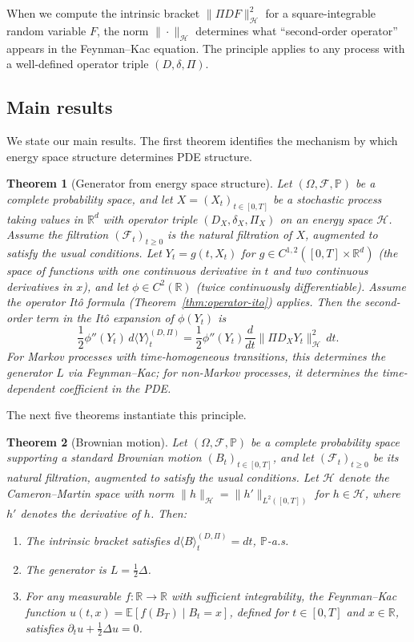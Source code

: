\documentclass[12pt]{article}
\theoremstyle{plain}
\newtheorem{theorem}{Theorem}[section]
\theoremstyle{definition}
\theoremstyle{remark}
\newcommand{\E}{\mathbb{E}}
\newcommand{\R}{\mathbb{R}}
\newcommand{\F}{\mathcal{F}}
\newcommand{\PP}{\mathbb{P}}
\newcommand{\HH}{\mathcal{H}}
\begin{document}
When we compute the intrinsic bracket $\|\Pi DF\|_{\HH}^2$ for a square-integrable random variable $F$, the norm $\|\cdot\|_{\HH}$ determines what ``second-order operator'' appears in the Feynman--Kac equation. The principle applies to any process with a well-defined operator triple $(D, \delta, \Pi)$.

\subsection{Main results}

We state our main results. The first theorem identifies the mechanism by which energy space structure determines PDE structure.

\begin{theorem}[Generator from energy space structure]\label{thm:main-mechanism}
Let $(\Omega, \F, \PP)$ be a complete probability space, and let $X = (X_t)_{t \in [0,T]}$ be a stochastic process taking values in $\R^d$ with operator triple $(D_X, \delta_X, \Pi_X)$ on an energy space $\HH$. Assume the filtration $(\F_t)_{t \geq 0}$ is the natural filtration of $X$, augmented to satisfy the usual conditions. Let $Y_t = g(t, X_t)$ for $g \in C^{1,2}([0,T] \times \R^d)$ (the space of functions with one continuous derivative in $t$ and two continuous derivatives in $x$), and let $\phi \in C^2(\R)$ (twice continuously differentiable). Assume the operator It\^{o} formula (Theorem~\ref{thm:operator-ito}) applies. Then the second-order term in the It\^{o} expansion of $\phi(Y_t)$ is
\begin{equation}\label{eq:second-order-term}
\frac{1}{2}\phi''(Y_t) \, d\langle Y \rangle_t^{(D,\Pi)} = \frac{1}{2}\phi''(Y_t) \frac{d}{dt}\|\Pi D_X Y_t\|_{\HH}^2 \, dt.
\end{equation}
For Markov processes with time-homogeneous transitions, this determines the generator $L$ via Feynman--Kac; for non-Markov processes, it determines the time-dependent coefficient in the PDE.
\end{theorem}

The next five theorems instantiate this principle.

\begin{theorem}[Brownian motion]\label{thm:BM}
Let $(\Omega, \F, \PP)$ be a complete probability space supporting a standard Brownian motion $(B_t)_{t \in [0,T]}$, and let $(\F_t)_{t \geq 0}$ be its natural filtration, augmented to satisfy the usual conditions. Let $\HH$ denote the Cameron--Martin space with norm $\|h\|_{\HH} = \|h'\|_{L^2([0,T])}$ for $h \in \HH$, where $h'$ denotes the derivative of $h$. Then:
\begin{enumerate}[label=(\alph*)]
\item The intrinsic bracket satisfies $d\langle B \rangle_t^{(D,\Pi)} = dt$, $\PP$-a.s.
\item The generator is $L = \frac{1}{2}\Delta$.
\item For any measurable $f: \R \to \R$ with sufficient integrability, the Feynman--Kac function $u(t,x) = \E[f(B_T) \mid B_t = x]$, defined for $t \in [0,T]$ and $x \in \R$, satisfies $\partial_t u + \frac{1}{2}\Delta u = 0$.
\end{enumerate}
\end{theorem}
\end{document}
